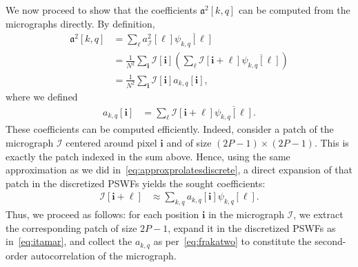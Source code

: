 \documentclass[english,11pt]{article}
\newcommand{\1}{\mathbf{1}}
\newcommand{\II}{\mathcal{I}}
\newcommand{\mb}{\mathbf}
\newcommand*\Bell{\ensuremath{\boldsymbol\ell}}
\numberwithin{equation}{section}
\theoremstyle{plain}
\theoremstyle{definition}
\theoremstyle{remark}
\theoremstyle{plain}
\theoremstyle{remark}
\theoremstyle{plain}
\theoremstyle{plain}
\begin{document}
We now proceed to show that the coefficients $\mathfrak{a}^2[k, q]$ can be computed from the micrographs directly.
By definition,
\begin{align}
\mathfrak{a}^2[k,q] & =\sum_{\Bell} a^2_\II[\Bell] \overline{\psi_{k,q}[\Bell]} \nonumber\\
	& = \frac{1}{N^2}\sum_{\mb i}\II[\mb i]\left(\sum_{\Bell}\II[\mb i+\Bell]\overline{\psi_{k,q}[\Bell]}\right) \nonumber \\
	& = \frac{1}{N^2}\sum_{\mb i}\II[\mb i] a_{k,q}[\mb i], \label{eq:frakatwo}
\end{align}
where we defined
\begin{align}
	a_{k,q}[\mb i] & = \sum_{\Bell}\II[\mb i+\Bell]\overline{\psi_{k,q}[\Bell]}.
	\label{eq:patchcoefficients}
\end{align}
These coefficients can be computed efficiently. Indeed, consider a patch of the micrograph $\II$ centered around pixel $\mb i$ and of size $(2P-1) \times (2P-1)$. This is exactly the patch indexed in the sum above. Hence, using the same approximation as we did in~\eqref{eq:approxprolatesdiscrete}, a direct expansion of that patch in the discretized PSWFs yields the sought coefficients:
\begin{align}
	\II[\mb i+\Bell] & \approx \sum_{k,q} a_{k,q}[\mb i] \psi_{k,q}[\Bell]. \label{eq:itamar}
\end{align}
Thus, we proceed as follows:
for each position $\mb i$ in the micrograph $\II$, we extract the corresponding patch of size $2P-1$, expand it in the discretized PSWFs as in~\eqref{eq:itamar}, and collect the $a_{k,q}$ as per~\eqref{eq:frakatwo} to constitute the second-order autocorrelation of the micrograph.
\end{document}
